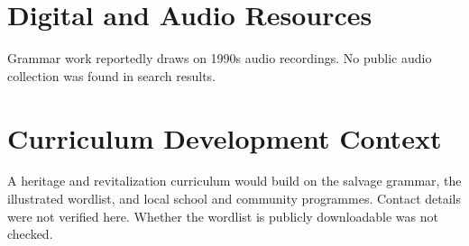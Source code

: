 \documentclass[12pt]{article}
\begin{document}
\section{Digital and Audio Resources}
Grammar work reportedly draws on 1990s audio recordings. No public audio collection was found in search results.

\section{Curriculum Development Context}
A heritage and revitalization curriculum would build on the salvage grammar, the illustrated wordlist, and local school and community programmes. Contact details were not verified here. Whether the wordlist is publicly downloadable was not checked.
\end{document}
